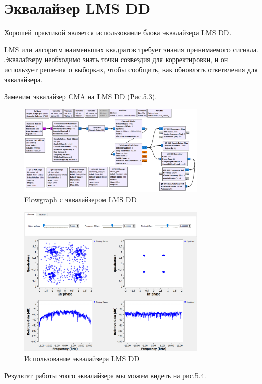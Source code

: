 \documentclass[a4paper,12pt]{report}
\begin{document}
\section{Эквалайзер LMS DD}
    Хорошей практикой является использование блока эквалайзера LMS DD. 
    
    LMS или алгоритм наименьших квадратов требует знания принимаемого сигнала. Эквалайзеру необходимо знать точки созвездия для корректировки, и он использует решения о выборках, чтобы сообщить, как обновлять ответвления для эквалайзера.
    
    Заменим эквалайзер CMA на LMS DD (Рис.5.3).
\begin{figure}[H]
        \centering
        \includegraphics[width=0.8\textwidth]{fig5-3.PNG}
        \caption{Flowgraph с эквалайзером LMS DD}
        \label{fig:fig5-3}
\end{figure}
\begin{figure}[H]
        \centering
        \includegraphics[width=0.8\textwidth]{fig5-4.PNG}
        \caption{Использование эквалайзера LMS DD}
        \label{fig:fig5-4}
\end{figure}

    Результат работы этого эквалайзера мы можем видеть на рис.5.4.
    
\end{document}
